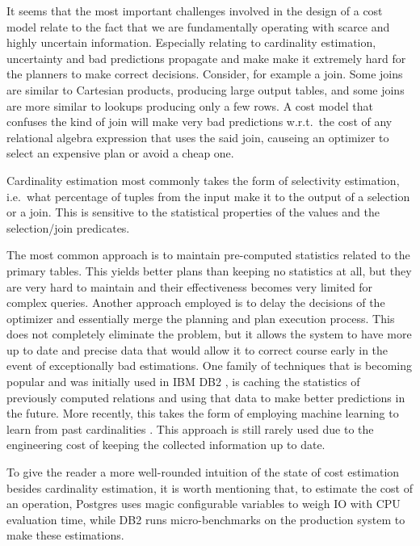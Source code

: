 It seems that the most important challenges involved in the design of
a cost model relate to the fact that we are fundamentally operating
with scarce and highly uncertain information. Especially relating to
cardinality estimation, uncertainty and bad predictions propagate and
make make it extremely hard for the planners to make correct
decisions. Consider, for example a join. Some joins are similar to
Cartesian products, producing large output tables, and some joins are
more similar to lookups producing only a few rows. A cost model that
confuses the kind of join will make very bad predictions w.r.t.\ the
cost of any relational algebra expression that uses the said join,
causeing an optimizer to select an expensive plan or avoid a cheap
one.

Cardinality estimation most commonly takes the form of selectivity
estimation, i.e.\ what percentage of tuples from the input make it to
the output of a selection or a join. This is sensitive to the
statistical properties of the values and the selection/join
predicates.

The most common approach is to maintain pre-computed statistics
related to the primary tables. This yields better plans than keeping
no statistics at all, but they are very hard to maintain and their
effectiveness becomes very limited for complex queries. Another
approach employed is to delay the decisions of the optimizer and
essentially merge the planning and plan execution process. This does
not completely eliminate the problem, but it allows the system to have
more up to date and precise data that would allow it to correct course
early in the event of exceptionally bad estimations. One family of
techniques that is becoming popular and was initially used in IBM DB2
\cite{stillgerLEODB2LearningOptimizer2001}, is caching the statistics
of previously computed relations and using that data to make better
predictions in the future. More recently, this takes the form of
employing machine learning to learn from past cardinalities
\cite{ortizEmpiricalAnalysisDeep2019}. This approach is still rarely
used due to the engineering cost of keeping the collected information
up to date.

To give the reader a more well-rounded intuition of the state of cost
estimation besides cardinality estimation, it is worth mentioning that,
to estimate the cost of an operation, Postgres uses magic configurable
variables to weigh IO with CPU evaluation time, while DB2 runs
micro-benchmarks on the production system to make these estimations.

